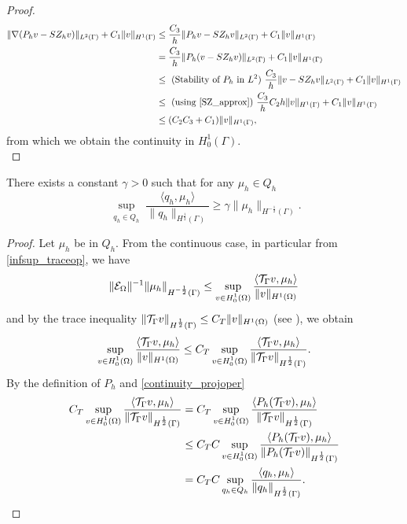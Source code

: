 \begin{proof}
\begin{equation*}
\begin{split}
\|\nabla (P_h v - SZ_h v)\|_{L^2(\Gamma)} + C_1\|v\|_{H^1(\Gamma)}
&\leq \frac{C_3}{h} \|P_h v - SZ_h v\|_{L^2(\Gamma)} + C_1\|v\|_{H^1(\Gamma)}\\
&= \frac{C_3}{h} \|P_h (v - SZ_h v)\|_{L^2(\Gamma)} + C_1\|v\|_{H^1(\Gamma)}\\
&\leq  \text{ (Stability of $P_h$ in $L^2$) } \frac{C_3}{h} \|v - SZ_h v\|_{L^2(\Gamma)} + C_1\|v\|_{H^1(\Gamma)}\\
&\leq \text{ (using \eqref{SZ_approx}) } \frac{C_3}{h} C_2 h  \| v\|_{H^1(\Gamma)} + C_1\|v\|_{H^1(\Gamma)}\\
&\leq (C_2 C_3 +C_1) \|v\|_{H^1(\Gamma)},
\end{split}
\end{equation*}
from which we obtain the continuity in $H^1_0(\Gamma)$.\\
\end{proof}
\begin{lemma}\label{lemma:trspace_infsup} 
There exists a constant $\gamma >0$ such that for any $\mu_h\in Q_h$
\begin{equation*}
\sup_{\substack{q_h \in Q_h}} \frac{\langle q_h , \mu_h \rangle}{ \|q_h\|_{H^{\frac 12}(\Gamma)}} \geq \gamma \|\mu_h\|_{H^{-\frac 12}(\Gamma)}.
\end{equation*} 
\end{lemma}
\begin{proof}
Let $\mu_h$ be in $Q_h$. From the continuous case, in particular from \eqref{infsup_traceop}, we have
\begin{equation*}
\|\mathcal{E}_\Omega\|^{-1} \|\mu_h\|_{H^{-\frac 12}(\Gamma)} \leq \sup_{\substack{v \in H^1_0(\Omega)}} \frac{\langle {\mathcal{T}_\Gamma} v , \mu_h \rangle}{\|v\|_{H^1(\Omega)}} 
\end{equation*}
and by the trace inequality $\|{\mathcal{T}_\Gamma} v\|_{H^\frac 12 (\Gamma)} \leq C_T \|v\|_{H^1(\Omega)}$ (see \cite[7.56]{adams1975pure}), we obtain 
\begin{equation*}
\sup_{\substack{v \in H^1_0(\Omega)}} \frac{\langle {\mathcal{T}_\Gamma} v , \mu_h \rangle}{\|v\|_{H^1(\Omega)}}
\leq C_T \sup_{\substack{v \in H^1_0(\Omega)}} \frac{\langle {\mathcal{T}_\Gamma} v , \mu_h \rangle}{ \|{\mathcal{T}_\Gamma} v\|_{H^{\frac 12}(\Gamma)}}.
\end{equation*}
By the definition of $P_h$ and \eqref{continuity_projoper} 
\begin{equation*}
\begin{split}
C_T \sup_{\substack{v \in H^1_0(\Omega)}} \frac{\langle {\mathcal{T}_\Gamma} v , \mu_h \rangle}{ \|{\mathcal{T}_\Gamma} v\|_{H^{\frac 12}(\Gamma)}}&= C_T \sup_{\substack{v \in H^1_0(\Omega)}} \frac{\langle P_h({\mathcal{T}_\Gamma} v) , \mu_h \rangle}{ \|{\mathcal{T}_\Gamma} v\|_{H^{\frac 12}(\Gamma)}}\\
&\leq  C_T C \sup_{\substack{v \in H^1_0(\Omega)}} \frac{\langle P_h({\mathcal{T}_\Gamma} v) , \mu_h \rangle}{ \|P_h({\mathcal{T}_\Gamma} v)\|_{H^{\frac 12}(\Gamma)}}\\
&= C_T C \sup_{\substack{q_h \in Q_h}} \frac{\langle q_h , \mu_h \rangle}{  \|q_h\|_{H^{\frac 12}(\Gamma)}}.
\end{split}
\end{equation*}
\end{proof}

